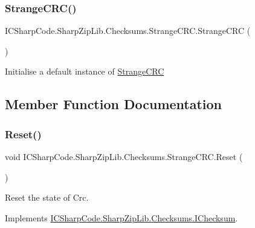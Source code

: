 \subsubsection{\texorpdfstring{Strange\+C\+R\+C()}{StrangeCRC()}\hspace{0.1cm}{\footnotesize\ttfamily [2/2]}}
{\footnotesize\ttfamily I\+C\+Sharp\+Code.\+Sharp\+Zip\+Lib.\+Checksums.\+Strange\+C\+R\+C.\+Strange\+C\+RC (\begin{DoxyParamCaption}{ }\end{DoxyParamCaption})\hspace{0.3cm}{\ttfamily [inline]}}



Initialise a default instance of \hyperlink{class_i_c_sharp_code_1_1_sharp_zip_lib_1_1_checksums_1_1_strange_c_r_c}{Strange\+C\+RC} 



\subsection{Member Function Documentation}
\mbox{\label{class_i_c_sharp_code_1_1_sharp_zip_lib_1_1_checksums_1_1_strange_c_r_c_aca2448f26ffa4b9350696a62352b6673}} 
\subsubsection{\texorpdfstring{Reset()}{Reset()}\hspace{0.1cm}{\footnotesize\ttfamily [1/2]}}
{\footnotesize\ttfamily void I\+C\+Sharp\+Code.\+Sharp\+Zip\+Lib.\+Checksums.\+Strange\+C\+R\+C.\+Reset (\begin{DoxyParamCaption}{ }\end{DoxyParamCaption})\hspace{0.3cm}{\ttfamily [inline]}}



Reset the state of Crc. 



Implements \hyperlink{interface_i_c_sharp_code_1_1_sharp_zip_lib_1_1_checksums_1_1_i_checksum_a43ef0e6e9e22a503da94790835a0a384}{I\+C\+Sharp\+Code.\+Sharp\+Zip\+Lib.\+Checksums.\+I\+Checksum}.

